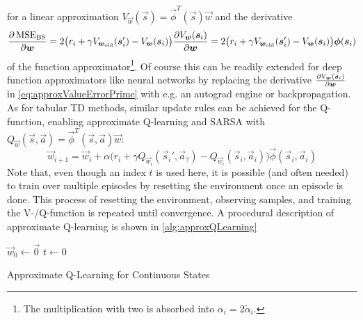		for a linear approximation \( V_{\vec{w}}(\vec{s}) = \vec{\phi}^T(\vec{s}) \vec{w} \) and the derivative
		\begin{equation}
			\pdv{\operatorname{MSE}_\mathrm{BS}}{\bm{w}}
			= 2 \big( r_i + \gamma V_{\bm{w}_\mathrm{old}}(\bm{s}_i') - V_{\bm{w}}(\bm{s}_i) \big) \pdv{V_{\bm{w}}(\bm{s}_i)}{\bm{w}}
			= 2 \big( r_i + \gamma V_{\bm{w}_\mathrm{old}}(\bm{s}_i') - V_{\bm{w}}(\bm{s}_i) \big) \bm{\phi}(\bm{s}_i)  \label{eq:approxValueErrorPrime}
		\end{equation}
		of the function approximator\footnote{The multiplication with two is absorbed into \( \alpha_i = 2 \tilde{\alpha}_i \).}. Of course this can be readily extended for deep function approximators like neural networks by replacing the derivative \( \pdv{V_{\bm{w}}(\bm{s}_i)}{\bm{w}} \) in \eqref{eq:approxValueErrorPrime} with e.g. an autograd engine or backpropagation. As for tabular TD methods, similar update rules can be achieved for the Q-function, enabling approximate Q-learning and SARSA with \( Q_{\vec{w}}(\vec{s}, \vec{a}) = \vec{\phi}^T(\vec{s}, \vec{a}) \vec{w} \):
		\begin{equation*}
			\vec{w}_{i + 1} = \vec{w}_i + \alpha \big( r_i + \gamma Q_{\vec{w}_i}(\vec{s}_i', \vec{a}_?) - Q_{\vec{w}_i}(\vec{s}_i, \vec{a}_i) \big) \vec{\phi}(\vec{s}_i, \vec{a}_i)
		\end{equation*}
		Note that, even though an index \(t\) is used here, it is possible (and often needed) to train over multiple episodes by resetting the environment once an episode is done. This process of resetting the environment, observing samples, and training the V-/Q-function is repeated until convergence. A procedural description of approximate Q-learning is shown in \autoref{alg:approxQLearning}

		\begin{algorithm}  \DontPrintSemicolon
			\( \vec{w}_0 \gets \vec{0} \) \;
			\( t \gets 0 \) \;

			\caption{Approximate Q-Learning for Continuous States}
			\label{alg:approxQLearning}
		\end{algorithm}

